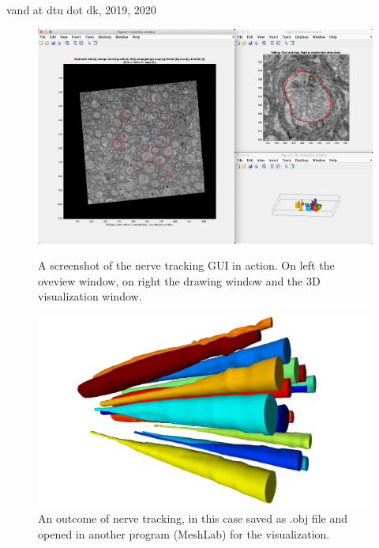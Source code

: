 \documentclass[paper=a4, fontsize=8pt]{article}
\begin{document}
\noindent vand at dtu dot dk, 2019, 2020

\newpage
	
	\begin{figure}
		\centering
		\includegraphics[width=0.9\linewidth]{images/GUI_Screenshot}
		\caption{A screenshot of the nerve tracking GUI in action. On left the oveview window, on right the drawing window and the 3D visualization window.}
		\label{fig:guiscreenshot}
		\vspace{3\baselineskip}
		\includegraphics[width=\linewidth]{images/EM_mouse_meshes_screenshot}
		\caption{An outcome of nerve tracking, in this case saved as .obj file and opened in another program (MeshLab) for the visualization.}
		\label{fig:mousenerves}
	\end{figure}
\end{document}

